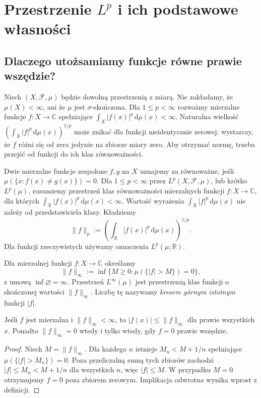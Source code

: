 \chapter{Przestrzenie $L^p$ i ich podstawowe własności}
\label{ch:przestrzenie-lp}

\section{Dlaczego utożsamiamy funkcje równe prawie wszędzie?}
Niech $(X,\mathcal F,\mu)$ będzie dowolną przestrzenią z miarą.
Nie zakładamy, że $\mu(X)<\infty$, ani że $\mu$ jest $\sigma$-skończona.
Dla $1\le p<\infty$ rozważmy mierzalne funkcje
$f:X\to\mathbb C$ spełniające
$\int_X|f(x)|^p\,\mathrm d\mu(x)<\infty$.
Naturalna wielkość
$(\int_X|f|^p\,\mathrm d\mu(x))^{1/p}$
może znikać dla funkcji nieidentycznie zerowej:
wystarczy, że $f$ różni się od zera jedynie na zbiorze
miary zero. Aby otrzymać normę, trzeba przejść
od funkcji do ich klas równoważności.

\begin{definicja}
\label{def:lp-14}
Dwie mierzalne funkcje zespolone $f,g$ na $X$
uznajemy za równoważne, jeśli $\mu(\{x:f(x)\ne g(x)\})=0$.
Dla $1\le p<\infty$ przez $L^p(X,\mathcal F,\mu)$, lub
krótko $L^p(\mu)$, rozumiemy przestrzeń klas
równoważności mierzalnych funkcji $f:X\to\mathbb C$,
dla których $\int_X|f(x)|^p\,\mathrm d\mu(x)<\infty$.
Wartość wyrażenia $\int_X|f|^p\,\mathrm d\mu(x)$
nie zależy od przedstawiciela klasy. Kładziemy
\begin{equation}\label{eq:p-norm-14}
\|f\|_p:=\left(\int_X|f(x)|^p\,\mathrm d\mu(x)\right)^{1/p}.
\end{equation}
Dla funkcji rzeczywistych używamy oznaczenia $L^p(\mu;\mathbb R)$.
\end{definicja}

\begin{definicja}
\label{def:linf-14}
Dla mierzalnej funkcji $f:X\to\mathbb C$ określamy
\[
\|f\|_\infty:=\inf\{M\ge0:\mu(\{|f|>M\})=0\},
\]
z umową $\inf\varnothing=\infty$.
Przestrzeń $L^\infty(\mu)$ jest przestrzenią klas
funkcji o skończonej wartości $\|f\|_\infty$.
Liczbę tę nazywamy \emph{kresem górnym istotnym} funkcji $|f|$.
\end{definicja}

\begin{lemat}
\label{lem:esssup-14}
Jeśli $f$ jest mierzalna i $\|f\|_\infty<\infty$,
to $|f(x)|\le\|f\|_\infty$ dla prawie wszystkich $x$.
Ponadto $\|f\|_\infty=0$ wtedy i tylko wtedy, gdy
$f=0$ prawie wszędzie.
\end{lemat}
\begin{proof}
Niech $M=\|f\|_\infty$. Dla każdego $n$ istnieje
$M_n<M+1/n$ spełniające $\mu(\{|f|>M_n\})=0$.
Poza przeliczalną sumą tych zbiorów zachodzi
$|f|\le M_n<M+1/n$ dla wszystkich $n$, więc $|f|\le M$.
W przypadku $M=0$ otrzymujemy $f=0$ poza zbiorem zerowym.
Implikacja odwrotna wynika wprost z definicji.
\end{proof}

